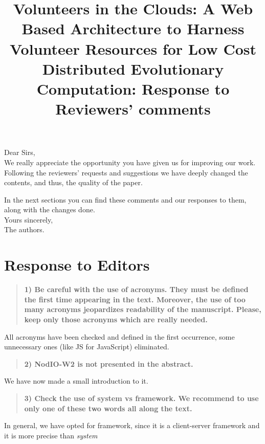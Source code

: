 \documentclass[preprint]{elsarticle}
\begin{document}

\title{Volunteers in the Clouds: A Web Based Architecture to Harness Volunteer Resources 
for Low Cost Distributed Evolutionary Computation: Response to Reviewers' comments}

\noindent
Dear Sirs,\\

We really appreciate the opportunity you have given us for improving
our work. Following the reviewers' requests and suggestions we have
deeply changed the contents, and thus, the quality of the paper. 

In the next sections you can find these comments and our responses
to them, along with the changes done.\\ 

\noindent
Yours sincerely,\\
The authors.


\section{Response to Editors}


\begin{quote}
\textbf{1) Be careful with the use of acronyms. They must be defined
  the first time appearing in the text. Moreover, the use of too many
  acronyms jeopardizes readability of the manuscript. Please, keep
  only those acronyms which are really needed.\\}
\end{quote}

All acronyms have been checked and defined in the first occurrence,
some unnecessary ones (like JS for JavaScript) eliminated. 

\begin{quote}
\textbf{
2) NodIO-W2 is not presented in the abstract.}
\end{quote}

We have now made a small introduction to it.

\begin{quote}
\textbf{3) Check the use of system vs framework.
We recommend to use only one of these two words all along the text.}
\end{quote}

In general, we have opted for framework, since it is a client-server
framework and it is more precise than {\em system}
\end{document}
